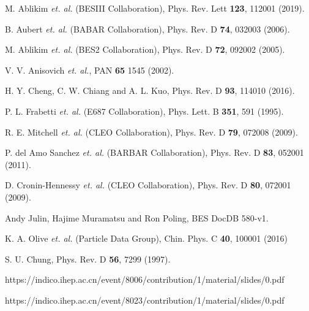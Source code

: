 \newpage
\begin{thebibliography}{99}

M. Ablikim {\it et. al.} (BESIII Collaboration),
Phys. Rev. Lett \textbf{123}, 112001 (2019).

B. Aubert {\it et. al.} (BABAR Collaboration),
Phys. Rev. D \textbf{74}, 032003 (2006).

M. Ablikim {\it et. al.} (BES2 Collaboration),
Phys. Rev. D \textbf{72}, 092002 (2005).

V. V. Anisovich {\it et. al.},
PAN \textbf{65} 1545 (2002).

    H. Y. Cheng, C. W. Chiang and A. L. Kuo,
    Phys. Rev. D \textbf{93}, 114010 (2016).


%
%
%
    P. L. Frabetti {\it et. al.} (E687 Collaboration),
    Phys. Lett. B \textbf{351}, 591 (1995).

R. E. Mitchell {\it et. al.}  (CLEO Collaboration),
Phys. Rev. D \textbf{79}, 072008 (2009).

P. del Amo Sanchez {\it et. al.} (BARBAR Collaboration),
Phys. Rev. D \textbf{83}, 052001 (2011).


D. Cronin-Hennessy {\it et. al.} (CLEO Collaboration),
Phys. Rev. D \textbf{80}, 072001 (2009).

Andy Julin, Hajime Muramatsu and Ron Poling,  
BES\uppercase\expandafter{} DocDB 580-v1.


K. A. Olive {\it et. al.} (Particle Data Group), 
Chin. Phys. C \textbf{40}, 100001 (2016)

S. U. Chung,
Phys. Rev. D \textbf{56}, 7299 (1997).

https://indico.ihep.ac.cn/event/8006/contribution/1/material/slides/0.pdf

https://indico.ihep.ac.cn/event/8023/contribution/1/material/slides/0.pdf



\end{thebibliography}
